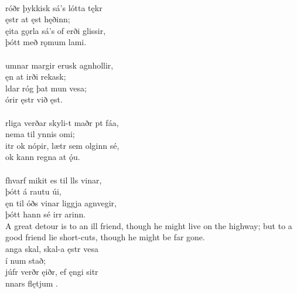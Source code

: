  \\

\bva {}róðr þykkisk \hld sá's lótta tękr \\%
\ind {}ęstr at ęst hęðinn; \\%
ęita gǫrla \hld sá's of erði glissir, \\%
\ind þótt með rǫmum lami.\\%

 \\

\bva {}umnar margir \hld erusk agnhollir, \\%
\ind ęn at irði rekask; \\%
ldar róg \hld þat mun  vesa; \\%
\ind órir ęstr við ęst.\\%

 \\

\bva {}rliga verðar \hld skyli-t maðr pt fáa, \\%
\ind nema til ynnis omi; \\%
itr ok nópir, \hld lætr sem olginn sé, \\%
\ind ok kann regna at ǫ́u.\\%

 \\

\bva {}fhvarf mikit \hld es til lls vinar, \\%
\ind þótt á rautu úi, \\%
ęn til óðs vinar \hld liggja agnvegir, \\%
\ind þótt hann sé irr arinn.\\%

\bvb A great detour is to an ill friend, though he might live on the highway; but to a good friend lie short-cuts, though he might be far gone. \\

\bva {}anga skal, \hld skal-a ęstr vesa \\%
\ind {} í num stað; \\%
júfr verðr ęiðr, \hld ef ęngi sitr \\%
\ind {}nnars flętjum .\\%

